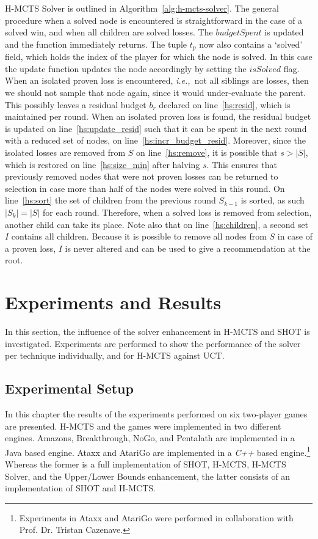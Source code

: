 \documentclass{icga}
\newcommand{\ie}{{\it i.e.,}~}
\newcommand{\func}[1]{{\sc #1}}
\begin{document}
H-MCTS Solver is outlined in Algorithm~\ref{alg:h-mcts-solver}. The general procedure when a solved node is encountered is straightforward in the case of a solved win, and when all children are solved losses. The $budgetSpent$ is updated and the function immediately returns. The tuple $t_p$ now also contains a `solved' field, which holds the index of the player for which the node is solved. In this case the \func{update} function updates the node accordingly by setting the $isSolved$ flag. When an isolated proven loss is encountered, \ie not all siblings are losses, then we should not sample that node again, since it would under-evaluate the parent. This possibly leaves a residual budget $b_r$ declared on line~\ref{hs:resid}, which is maintained per round. When an isolated proven loss is found, the residual budget is updated on line~\ref{hs:update_resid} such that it can be spent in the next round with a reduced set of nodes, on line~\ref{hs:incr_budget_resid}. Moreover, since the isolated losses are removed from $S$ on line~\ref{hs:remove}, it is possible that $s > |S|$, which is restored on line~\ref{hs:size_min} after halving $s$. This ensures that previously removed nodes that were not proven losses can be returned to selection in case more than half of the nodes were solved in this round. On line~\ref{hs:sort} the set of children from the previous round $S_{k-1}$ is sorted, as such $|S_k| = |S|$ for each round. Therefore, when a solved loss is removed from selection, another child can take its place. Note also that on line~\ref{hs:children}, a second set $I$ contains all children. Because it is possible to remove all nodes from $S$ in case of a proven loss, $I$ is never altered and can be used to give a recommendation at the root.

\section{Experiments and Results}
\label{sec:experiments}
In this section, the influence of the solver enhancement in H-MCTS and SHOT is investigated. Experiments are performed to show the performance of the solver per technique individually, and for H-MCTS against UCT.

\subsection{Experimental Setup}
\label{subsec:ex_setup}
In this chapter the results of the experiments performed on six two-player games are presented. H-MCTS and the games were implemented in two different engines. Amazons, Breakthrough, NoGo, and Pentalath are implemented in a Java based engine. Ataxx and AtariGo are implemented in a \emph{C++} based engine.\footnote{Experiments in Ataxx and AtariGo were performed in collaboration with Prof. Dr. Tristan Cazenave.} Whereas the former is a full implementation of SHOT, H-MCTS, H-MCTS Solver, and the Upper/Lower Bounds enhancement, the latter consists of an implementation of SHOT and H-MCTS.
\end{document}
